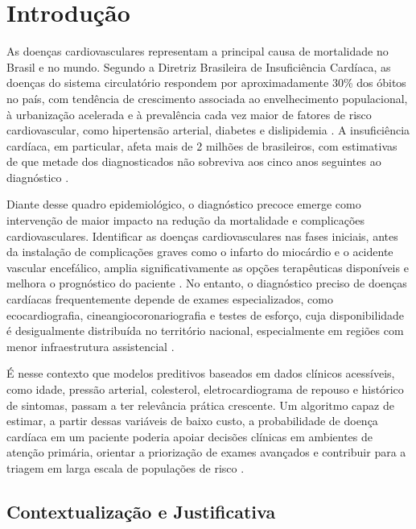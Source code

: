 \chapter{Introdução}
\label{cap:introducao}

As doen\c cas cardiovasculares representam a principal causa de mortalidade no Brasil e no mundo. Segundo a Diretriz Brasileira de Insufici\^encia Card\'iaca, as doen\c cas do sistema circulat\'orio respondem por aproximadamente 30\% dos \'obitos no pa\'is, com tend\^encia de crescimento associada ao envelhecimento populacional, \`a urbaniza\c c\~ao acelerada e \`a preval\^encia cada vez maior de fatores de risco cardiovascular, como hipertens\~ao arterial, diabetes e dislipidemia \cite{rohde2018}. A insufici\^encia card\'iaca, em particular, afeta mais de 2 milh\~oes de brasileiros, com estimativas de que metade dos diagnosticados n\~ao sobreviva aos cinco anos seguintes ao diagn\'ostico \cite{rohde2018}.

Diante desse quadro epidemiol\'ogico, o diagn\'ostico precoce emerge como interven\c c\~ao de maior impacto na redu\c c\~ao da mortalidade e complica\c c\~oes cardiovasculares. Identificar as doen\c cas cardiovasculares nas fases iniciais, antes da instala\c c\~ao de complica\c c\~oes graves como o infarto do mioc\'ardio e o acidente vascular encef\'alico, amplia significativamente as op\c c\~oes terap\^euticas dispon\'iveis e melhora o progn\'ostico do paciente \cite{porto2019}. No entanto, o diagn\'ostico preciso de doen\c cas card\'iacas frequentemente depende de exames especializados, como ecocardiografia, cineangiocoronariografia e testes de esfor\c co, cuja disponibilidade \'e desigualmente distribu\'ida no territ\'orio nacional, especialmente em regi\~oes com menor infraestrutura assistencial \cite{brandao2025}.

\'E nesse contexto que modelos preditivos baseados em dados cl\'inicos acess\'iveis, como idade, press\~ao arterial, colesterol, eletrocardiograma de repouso e hist\'orico de sintomas, passam a ter relev\^ancia pr\'atica crescente. Um algoritmo capaz de estimar, a partir dessas vari\'aveis de baixo custo, a probabilidade de doen\c ca card\'iaca em um paciente poderia apoiar decis\~oes cl\'inicas em ambientes de aten\c c\~ao prim\'aria, orientar a prioriza\c c\~ao de exames avan\c cados e contribuir para a triagem em larga escala de popula\c c\~oes de risco \cite{mesquita2020}.

\section{Contextualiza\c c\~ao e Justificativa}

